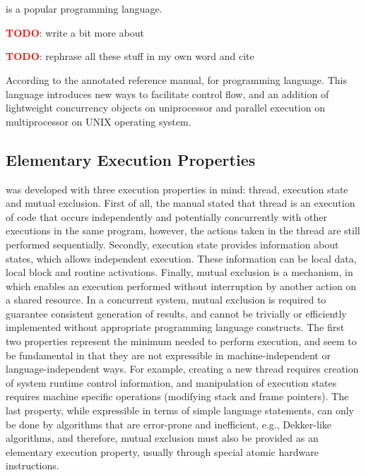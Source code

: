 \chapter{\uCPP} \label{uCPP}
\CCS is a popular programming language.

\textbf{\textcolor{red}{TODO}}: write a bit more about \CC

\textbf{\textcolor{red}{TODO}}: rephrase all these stuff in my own word and cite

According to the \uCPP annotated reference manual, \uCPPS
for \CCS programming language. This language introduces new ways to facilitate
control flow, and an addition of lightweight concurrency objects on
uniprocessor and parallel execution on multiprocessor on UNIX operating
system.

\section{Elementary Execution Properties}
\uCPPS was developed with three execution properties in mind: thread,
execution state and mutual exclusion. First of all, the manual stated that
thread is an execution of code that occurs independently and potentially
concurrently with other executions in the same program, however, the actions
taken in the thread are still performed sequentially. Secondly, execution state
provides information about states, which allows independent execution. These
information can be local data, local block and routine activations. Finally,
mutual exclusion is a mechanism, in which enables an execution performed without
interruption by another action on a shared resource. In a concurrent system, mutual exclusion is required to guarantee consistent
generation
of results, and cannot be trivially or efficiently implemented without
appropriate programming language
constructs.
The first two properties represent the minimum needed to perform execution, and
seem to be fundamental in that
they are not expressible in machine-independent or language-independent ways.
For example, creating a new thread
requires creation of system runtime control information, and manipulation of
execution states requires machine specific
operations (modifying stack and frame pointers). The last property, while
expressible in terms of simple language
statements, can only be done by algorithms that are error-prone and inefficient,
e.g., Dekker-like algorithms, and
therefore, mutual exclusion must also be provided as an elementary execution
property, usually through special atomic
hardware instructions.

